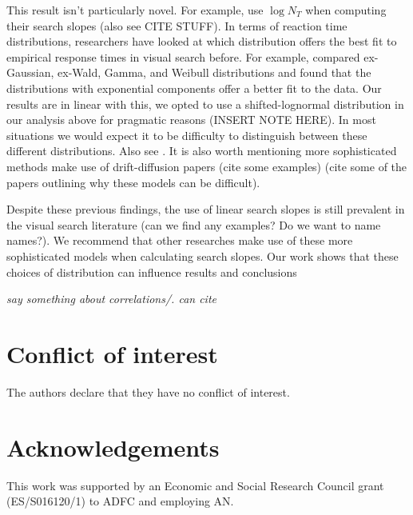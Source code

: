 \documentclass[preprint,12pt,authoryear]{elsarticle}
\begin{document}
This result isn't particularly novel. For example, \cite{buetti2019predicting} use $\log{N_T}$ when computing their search slopes (also see CITE STUFF). In terms of reaction time distributions, researchers have looked at which distribution offers the best fit to empirical response times in visual search before. For example, \cite{palmer2011shapes} compared ex-Gaussian, ex-Wald, Gamma, and Weibull distributions and found that the distributions with exponential components offer a better fit to the data. Our results are in linear with this, we opted to use a shifted-lognormal distribution in our analysis above for pragmatic reasons (INSERT NOTE HERE). In most situations we would expect it to be difficulty to distinguish between these different distributions. Also see \citep{wolfe2010reaction}. It is also worth mentioning more sophisticated methods make use of drift-diffusion papers (cite some examples) (cite some of the papers outlining why these models can be difficult).  

Despite these previous findings, the use of linear search slopes is still prevalent in the visual search literature (can we find any examples? Do we want to name names?). We recommend that other researches make use of these more sophisticated models when calculating search slopes. Our work shows that these choices of distribution can influence results and conclusions 




\textit{say something about correlations/. can cite \cite{clarke2020stable}}

%
\section*{Conflict of interest}
The authors declare that they have no conflict of interest.

\section*{Acknowledgements}
This work was supported by an Economic and Social Research Council grant (ES/S016120/1) to ADFC and employing AN.

\end{document}
